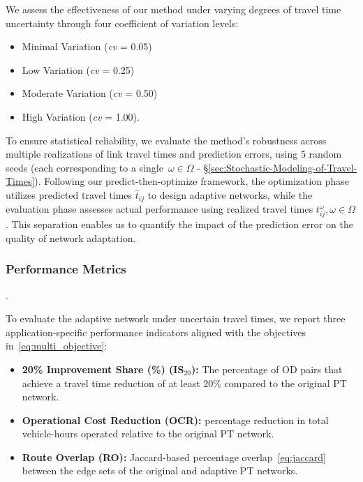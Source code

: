 \documentclass[a4paper,fleqn]{cas-sc}
\begin{document}
We assess the effectiveness of our method under varying degrees of travel time uncertainty through four coefficient of variation levels: 
\begin{itemize}
    \item Minimal Variation (\textit{cv} = 0.05)
    \item Low Variation (\textit{cv} = 0.25)
    \item Moderate Variation (\textit{cv} = 0.50)
    \item High Variation (\textit{cv} = 1.00).
\end{itemize}
To ensure statistical reliability, we evaluate the method's robustness across multiple realizations of link travel times and prediction errors, using 5 random seeds (each corresponding to a single~$\omega\in\Omega$ -  \S{}\ref{sec:Stochastic-Modeling-of-Travel-Times}).
%
Following our predict-then-optimize framework, the optimization phase utilizes predicted travel times $\hat{t}_{ij}$ to design adaptive networks, while the evaluation phase assesses actual performance using realized travel times $t_{ij}^\omega,\omega\in\Omega$. This separation enables us to quantify the impact of the prediction error on the quality of network adaptation.

\subsubsection{Performance Metrics}\label{sec:performMETRICS}.

To evaluate the adaptive network under uncertain travel times, we report three
application-specific performance indicators aligned with the objectives
in~\eqref{eq:multi_objective}:

\begin{itemize}
    \item \textbf{20\% Improvement Share (\%) (IS$_{20}$):} The percentage of OD pairs that achieve a travel time reduction of at least 20\% compared to the original PT network.
    \item \textbf{Operational Cost Reduction (OCR):} percentage reduction in
    total vehicle-hours operated relative to the original PT network.
    \item \textbf{Route Overlap (RO):} Jaccard-based percentage overlap~\eqref{eq:jaccard} between the edge sets of the original and adaptive PT networks.
\end{itemize}
\end{document}
